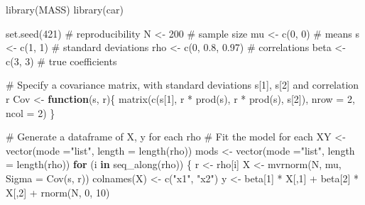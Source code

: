 \documentclass[
  letterpaper,
  10pt,
  krantz2]{krantz}
\makeatletter
\newenvironment{Shaded}{\begin{snugshade}}{\end{snugshade}}
\newcommand{\AttributeTok}[1]{\textcolor[rgb]{0.40,0.45,0.13}{#1}}
\newcommand{\CommentTok}[1]{\textcolor[rgb]{0.37,0.37,0.37}{#1}}
\newcommand{\ControlFlowTok}[1]{\textcolor[rgb]{0.00,0.23,0.31}{\textbf{#1}}}
\newcommand{\DecValTok}[1]{\textcolor[rgb]{0.68,0.00,0.00}{#1}}
\newcommand{\FloatTok}[1]{\textcolor[rgb]{0.68,0.00,0.00}{#1}}
\newcommand{\FunctionTok}[1]{\textcolor[rgb]{0.28,0.35,0.67}{#1}}
\newcommand{\NormalTok}[1]{\textcolor[rgb]{0.00,0.23,0.31}{#1}}
\newcommand{\OtherTok}[1]{\textcolor[rgb]{0.00,0.23,0.31}{#1}}
\newcommand{\SpecialCharTok}[1]{\textcolor[rgb]{0.37,0.37,0.37}{#1}}
\newcommand{\StringTok}[1]{\textcolor[rgb]{0.13,0.47,0.30}{#1}}
\newenvironment{kframe}{%
  \medskip{}
  \setlength{\fboxsep}{.8em}
  \def\at@end@of@kframe{}%
  \ifinner\ifhmode%
  \def\at@end@of@kframe{\end{minipage}}%
  \begin{minipage}{\columnwidth}%
  \fi\fi%
  \def\FrameCommand##1{\hskip\@totalleftmargin \hskip-\fboxsep
  \colorbox{shadecolor}{##1}\hskip-\fboxsep
      \hskip-\linewidth \hskip-\@totalleftmargin \hskip\columnwidth}%
  \MakeFramed {\advance\hsize-\width
    \@totalleftmargin\z@ \linewidth\hsize
    \@setminipage}}%
{\par\unskip\endMakeFramed%
  \at@end@of@kframe}
\renewenvironment{Shaded}{\begin{kframe}}{\end{kframe}}
\makeatother
\begin{document}
\begin{Shaded}
\begin{Highlighting}[]
\FunctionTok{library}\NormalTok{(MASS)}
\FunctionTok{library}\NormalTok{(car)}

\FunctionTok{set.seed}\NormalTok{(}\DecValTok{421}\NormalTok{)            }\CommentTok{\# reproducibility}
\NormalTok{N }\OtherTok{\textless{}{-}} \DecValTok{200}                 \CommentTok{\# sample size}
\NormalTok{mu }\OtherTok{\textless{}{-}} \FunctionTok{c}\NormalTok{(}\DecValTok{0}\NormalTok{, }\DecValTok{0}\NormalTok{)            }\CommentTok{\# means}
\NormalTok{s }\OtherTok{\textless{}{-}} \FunctionTok{c}\NormalTok{(}\DecValTok{1}\NormalTok{, }\DecValTok{1}\NormalTok{)             }\CommentTok{\# standard deviations}
\NormalTok{rho }\OtherTok{\textless{}{-}} \FunctionTok{c}\NormalTok{(}\DecValTok{0}\NormalTok{, }\FloatTok{0.8}\NormalTok{, }\FloatTok{0.97}\NormalTok{)   }\CommentTok{\# correlations}
\NormalTok{beta }\OtherTok{\textless{}{-}} \FunctionTok{c}\NormalTok{(}\DecValTok{3}\NormalTok{, }\DecValTok{3}\NormalTok{)          }\CommentTok{\# true coefficients}

\CommentTok{\# Specify a covariance matrix, with standard deviations s[1], s[2] and correlation r}
\NormalTok{Cov }\OtherTok{\textless{}{-}} \ControlFlowTok{function}\NormalTok{(s, r)\{}
  \FunctionTok{matrix}\NormalTok{(}\FunctionTok{c}\NormalTok{(s[}\DecValTok{1}\NormalTok{],    r }\SpecialCharTok{*} \FunctionTok{prod}\NormalTok{(s),}
\NormalTok{         r }\SpecialCharTok{*} \FunctionTok{prod}\NormalTok{(s), s[}\DecValTok{2}\NormalTok{]), }\AttributeTok{nrow =} \DecValTok{2}\NormalTok{, }\AttributeTok{ncol =} \DecValTok{2}\NormalTok{)}
\NormalTok{\}}

\CommentTok{\# Generate a dataframe of X, y for each rho}
\CommentTok{\# Fit the model for each}
\NormalTok{XY }\OtherTok{\textless{}{-}} \FunctionTok{vector}\NormalTok{(}\AttributeTok{mode =}\StringTok{"list"}\NormalTok{, }\AttributeTok{length =} \FunctionTok{length}\NormalTok{(rho))}
\NormalTok{mods }\OtherTok{\textless{}{-}} \FunctionTok{vector}\NormalTok{(}\AttributeTok{mode =}\StringTok{"list"}\NormalTok{, }\AttributeTok{length =} \FunctionTok{length}\NormalTok{(rho))}
\ControlFlowTok{for}\NormalTok{ (i }\ControlFlowTok{in} \FunctionTok{seq\_along}\NormalTok{(rho)) \{}
\NormalTok{  r }\OtherTok{\textless{}{-}}\NormalTok{ rho[i]}
\NormalTok{  X }\OtherTok{\textless{}{-}} \FunctionTok{mvrnorm}\NormalTok{(N, mu, }\AttributeTok{Sigma =} \FunctionTok{Cov}\NormalTok{(s, r))}
  \FunctionTok{colnames}\NormalTok{(X) }\OtherTok{\textless{}{-}} \FunctionTok{c}\NormalTok{(}\StringTok{"x1"}\NormalTok{, }\StringTok{"x2"}\NormalTok{)}
\NormalTok{  y }\OtherTok{\textless{}{-}}\NormalTok{ beta[}\DecValTok{1}\NormalTok{] }\SpecialCharTok{*}\NormalTok{ X[,}\DecValTok{1}\NormalTok{] }\SpecialCharTok{+}\NormalTok{ beta[}\DecValTok{2}\NormalTok{] }\SpecialCharTok{*}\NormalTok{ X[,}\DecValTok{2}\NormalTok{] }\SpecialCharTok{+} \FunctionTok{rnorm}\NormalTok{(N, }\DecValTok{0}\NormalTok{, }\DecValTok{10}\NormalTok{)}


\end{Highlighting}
\end{Shaded}
\end{document}
